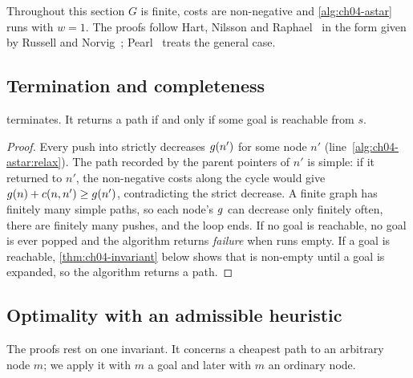 Throughout this section $G$ is finite, costs are non-negative and
\cref{alg:ch04-astar} runs with $w = 1$. The proofs follow Hart, Nilsson and
Raphael~\cite{hart1968formal,hart1972correction} in the form given by Russell
and Norvig~\cite{russell2020aima}; Pearl~\cite{pearl1984heuristics} treats the
general case.

\subsection{Termination and completeness}

\begin{proposition}
\label{thm:ch04-terminates}
 terminates. It returns a path if and only if some goal is
reachable from $s$.
\end{proposition}
\begin{proof}
Every push into \Open strictly decreases $g(n')$ for some node $n'$
(line~\ref{alg:ch04-astar:relax}). The path recorded by the parent pointers of
$n'$ is simple: if it returned to $n'$, the non-negative costs along the cycle
would give $g(n) + c(n, n') \ge g(n')$, contradicting the strict
decrease. A finite graph has finitely many simple paths, so each node's
$g$ can decrease only finitely often, there are finitely many pushes, and
the loop ends. If no goal is reachable, no goal is ever popped and the
algorithm returns \emph{failure} when \Open runs empty. If a goal is reachable,
\cref{thm:ch04-invariant} below shows that \Open is non-empty until a goal is
expanded, so the algorithm returns a path.
\end{proof}

\subsection{Optimality with an admissible heuristic}

The proofs rest on one invariant. It concerns a cheapest path to an arbitrary
node $m$; we apply it with $m$ a goal and later with $m$ an ordinary node.

